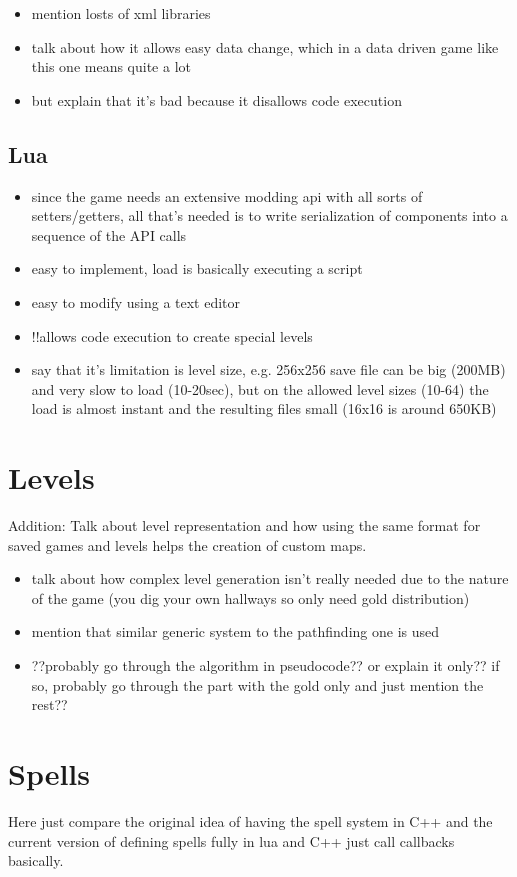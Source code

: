 \begin{itemize}
    \item mention losts of xml libraries
    \item talk about how it allows easy data change, which in a data driven game like this
	    one means quite a lot
    \item but explain that it's bad because it disallows code execution
\end{itemize}

\subsection{Lua}

\begin{itemize}
    \item since the game needs an extensive modding api with all sorts of setters/getters,
	    all that's needed is to write serialization of components into a sequence of
	    the API calls
    \item easy to implement, load is basically executing a script
    \item easy to modify using a text editor
    \item !!allows code execution to create special levels
    \item say that it's limitation is level size, e.g. 256x256 save file can be big (200MB) and
	    very slow to load (10-20sec), but on the allowed level sizes (10-64) the load
	    is almost instant and the resulting files small (16x16 is around 650KB)
\end{itemize}

\section{Levels}

Addition: Talk about level representation and how using the same
format for saved games and levels helps the creation of custom maps.

\begin{itemize}
    \item talk about how complex level generation isn't really needed due
	    to the nature of the game (you dig your own hallways so only need
	    gold distribution)
    \item mention that similar generic system to the pathfinding one is used
    \item ??probably go through the algorithm in pseudocode?? or explain it only??
	    if so, probably go through the part with the gold only and just mention
	    the rest??
\end{itemize}

\section{Spells}

Here just compare the original idea of having the spell system in C++ and the current version
of defining spells fully in lua and C++ just call callbacks basically.
